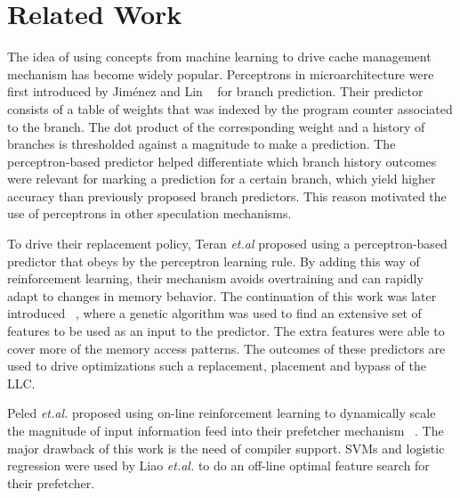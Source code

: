 \section{Related Work}
\label{related}


The idea of using concepts from machine learning to drive cache management mechanism has become widely popular. Perceptrons in microarchitecture were first introduced by Jim\'enez and Lin ~\cite{Perc_Branch} for branch prediction. Their predictor consists of a table of weights that was indexed by the program counter associated to the branch. The dot product of the corresponding weight and a history of branches is thresholded against a magnitude to make a prediction. The perceptron-based predictor helped differentiate which branch history outcomes were relevant for marking a prediction for a certain branch, which yield higher accuracy than previously proposed branch predictors. This reason motivated the use of perceptrons in other speculation mechanisms.

To drive their replacement policy, Teran \textit{et.al} proposed using a perceptron-based predictor that obeys by the perceptron learning rule. By adding this way of reinforcement learning, their mechanism avoids overtraining and can rapidly adapt to changes in memory behavior. The continuation of this work was later introduced ~\cite{Multiperspective}, where a genetic algorithm was used to find an extensive set of features to be used as an input to the predictor. The extra features were able to cover more of the memory access patterns. The outcomes of these predictors are used to drive optimizations such a replacement, placement and bypass of the LLC.   



Peled \textit{et.al.} proposed using on-line reinforcement learning to dynamically scale the magnitude of input information feed into their prefetcher mechanism ~\cite{Semantics}. The major drawback of this work is the need of compiler support. SVMs and logistic regression were used by Liao \textit{et.al.} to do an off-line optimal feature search for their prefetcher.

